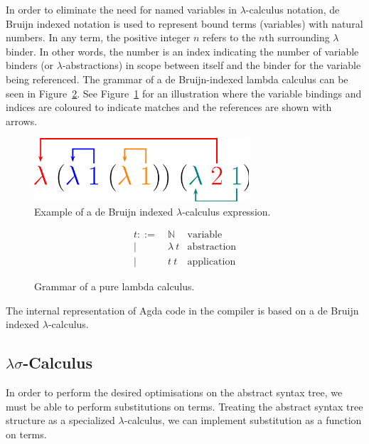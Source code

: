 In order to eliminate the need for named variables in $\lambda$-calculus notation, de Bruijn indexed notation is used to represent bound terms (variables) with natural numbers. In any term, the positive integer $n$ refers to the $n$th surrounding $\lambda$ binder.\cite{debruijn1972} In other words, the number is an index indicating the number of variable binders (or $\lambda$-abstractions) in scope between itself and the binder for the variable being referenced. The grammar of a de Bruijn-indexed lambda calculus can be seen in Figure~\ref{fig:db_lambda_calc}. See Figure~\ref{fig:db_example} for an illustration where the variable bindings and indices are coloured to indicate matches and the references are shown with arrows.

\begin{figure}[h]
\centering
\includegraphics[width=8cm]{Figures/DeBruijnIndex}
\caption{Example of a de Bruijn indexed $\lambda$-calculus expression.\cite{chaudhuri2009}}
\label{fig:db_example}
\end{figure}


\begin{figure}[h]
\begin{align*}
t ::=~& \mathbb{N}      & \text{variable}\\
    |~& \lambda~t       & \text{abstraction}\\
    |~& t~t             & \text{application}
\end{align*}
\caption{Grammar of a pure lambda calculus.}
\label{fig:db_lambda_calc}
\end{figure}

The internal representation of Agda code in the compiler is based on a de Bruijn indexed $\lambda$-calculus.

\subsection{$\lambda\sigma$-Calculus}

In order to perform the desired optimisations on the abstract syntax tree, we must be able to perform substitutions on terms. Treating the abstract syntax tree structure as a specialized $\lambda$-calculus, we can implement substitution as a function on terms.

